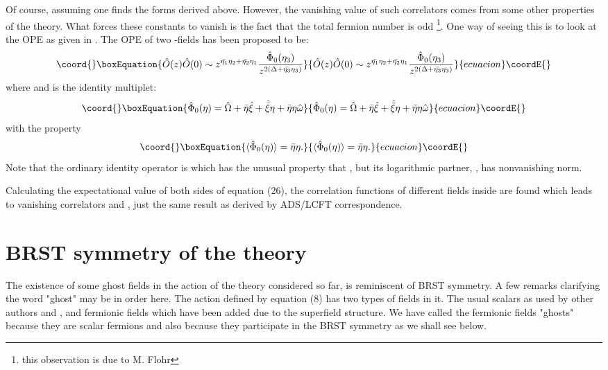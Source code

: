 \documentclass[a4paper,11pt]{article}
\begin{document}
Of course, assuming \coordHE{} one finds the forms derived above.
However, the vanishing value of such correlators comes from some
other properties of the theory. What forces these constants to
vanish is the fact that the total fermion number is odd
\footnote{this observation is due to M. Flohr}. One way of seeing
this is to look at the OPE as given in \cite{MRSAlgeb}. The OPE
of two \coordHE{}-fields has been proposed to be:
\begin{equation}\coord{}\boxEquation{\label{OPE}
\hat{O}(z)\hat{O}(0)\sim z^{\bar{\eta_1}\eta_2+\bar{\eta_2}\eta_1}
\frac{\hat{\Phi}_0(\eta_3)}{z^{2(\Delta+\bar{\eta_3}\eta_3)}}
}{\hat{O}(z)\hat{O}(0)\sim z^{\bar{\eta_1}\eta_2+\bar{\eta_2}\eta_1}
\frac{\hat{\Phi}_0(\eta_3)}{z^{2(\Delta+\bar{\eta_3}\eta_3)}}
}{ecuacion}\coordE{}\end{equation}
where \coordHE{} and \coordHE{} is
the identity multiplet:
\begin{equation}\coord{}\boxEquation{\label{Identity}
\hat{\Phi}_0(\eta)=\hat{\Omega} +
\bar{\eta}\hat{\xi}+\hat{\bar{\xi}}\eta+\bar{\eta}\eta\hat{\omega}
}{\hat{\Phi}_0(\eta)=\hat{\Omega} +
\bar{\eta}\hat{\xi}+\hat{\bar{\xi}}\eta+\bar{\eta}\eta\hat{\omega}
}{ecuacion}\coordE{}\end{equation}
with the property
\begin{equation}\coord{}\boxEquation{
\langle\hat{\Phi}_0(\eta)\rangle=\bar{\eta}\eta.
}{
\langle\hat{\Phi}_0(\eta)\rangle=\bar{\eta}\eta.
}{ecuacion}\coordE{}\end{equation}
Note that the ordinary identity operator is \myHighlight{$\hat{\Omega}$}\coordHE{} which
has the unusual property that \coordHE{}, but
its logarithmic partner, \myHighlight{$\hat{\omega}$}\coordHE{}, has nonvanishing norm.

Calculating the expectational value of both sides of equation
(26), the correlation functions of different fields inside
\coordHE{} are found which leads to vanishing correlators \coordHE{} and \coordHE{}, just the
same result as derived by ADS/LCFT correspondence.
\section{BRST symmetry of the theory}
The existence of some ghost fields in the action of the theory
considered so far, is reminiscent of BRST symmetry. A few remarks
clarifying the word "ghost" may be in order here. The action
defined by equation (8) has two types of fields in it. The usual
scalars as used by other authors \coordHE{} and \coordHE{}, and fermionic fields
\myHighlight{$\alpha$}\coordHE{} which have been added due to the superfield structure. We
have called the fermionic fields "ghosts" because they are scalar
fermions and also because they participate in the BRST symmetry
as we shall see below.
\end{document}
